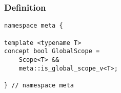 
\subsubsection{Definition}

\begin{verbatim}
namespace meta {

template <typename T>
concept bool GlobalScope =
	Scope<T> &&
	meta::is_global_scope_v<T>;

} // namespace meta
\end{verbatim}
